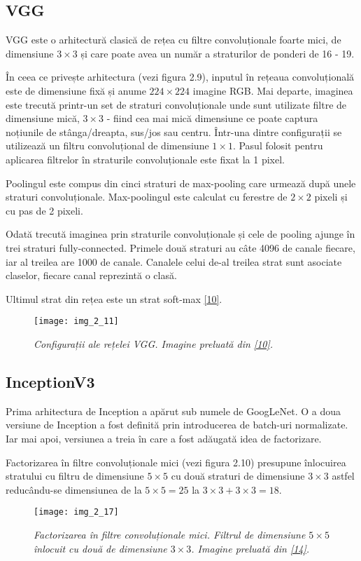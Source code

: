 \subsection{VGG}

VGG este o arhitectură clasică de rețea cu filtre convoluționale foarte mici, de dimensiune $3 \times 3$ și care poate avea un număr a straturilor de ponderi de 16 - 19. 

În ceea ce privește arhitectura (vezi figura 2.9), inputul în rețeaua convoluțională este de dimensiune fixă și anume $224 \times 224$ imagine RGB. Mai departe, imaginea este trecută printr-un set de straturi convoluționale unde sunt utilizate filtre de dimensiune mică, $3 \times 3$ - fiind cea mai mică dimensiune ce poate captura noțiunile de stânga/dreapta, sus/jos sau centru. Într-una dintre configurații se utilizează un filtru convoluțional de dimensiune $1 \times 1$. Pasul folosit pentru aplicarea filtrelor în straturile convoluționale este fixat la 1 pixel.

Poolingul este compus din cinci straturi de max-pooling care urmează după unele straturi convoluționale. Max-poolingul este calculat cu ferestre de $2\times2$ pixeli și cu pas de 2 pixeli.

Odată trecută imaginea prin straturile convoluționale și cele de pooling ajunge în trei straturi fully-connected. Primele două straturi au câte 4096 de canale fiecare, iar al treilea are 1000 de canale. Canalele celui de-al treilea strat sunt asociate claselor, fiecare canal reprezintă o clasă.

Ultimul strat din rețea este un strat soft-max \hyperlink{SimonyanKarenZissermanAndrew}{[10]}.

\begin{figure}[!h]
	\centering
	\texttt{[image: img\_2\_11]}
	\caption[Configurații VGG]{\textit{Configurații ale rețelei VGG. Imagine preluată din \hyperlink{SimonyanKarenZissermanAndrew}{[10]}.}}
\end{figure}   

\subsection{InceptionV3}
Prima arhitectura de Inception a apărut sub numele de GoogLeNet. O a doua versiune de Inception a fost definită prin introducerea de batch-uri normalizate. Iar mai apoi, versiunea a treia în care a fost adăugată idea de factorizare.

Factorizarea în filtre convoluționale mici (vezi figura 2.10) presupune înlocuirea stratului cu filtru de dimensiune $5 \times 5$ cu două straturi de dimensiune $3 \times 3$ astfel reducându-se dimensiunea de la $5 \times 5 = 25$ la $3 \times 3 + 3 \times 3 = 18$.
\begin{figure}[!h]
	\centering
	\texttt{[image: img\_2\_17]}
	\caption[Factorizarea în filtre convoluționale mici]{\textit{Factorizarea în filtre convoluționale mici. Filtrul de dimensiune $5 \times 5$ înlocuit cu două de dimensiune $3 \times 3$. Imagine preluată din \hyperlink{guideinceptionv3}{[14]}.}}
\end{figure}   


